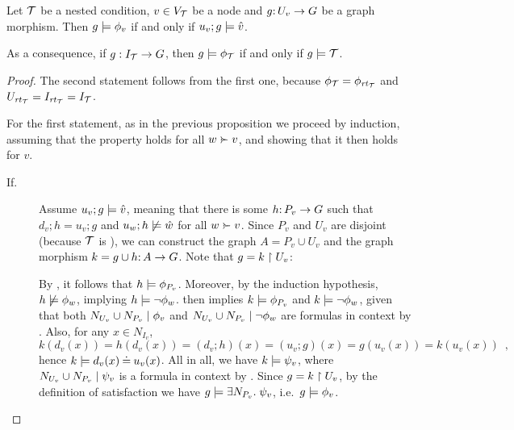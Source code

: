 \begin{theorem}
	\label{th:comparing satisfactions}
	Let ${\mathcal{T}}$ be a {\proper} nested condition, $v \in V_{\mathcal{T}}$ be a node and $g{:}\, U_v \rightarrow G$ be a graph morphism. Then $g\models \phi_v$ if and only if $u_v;g\models \hat v$. 
	
	As a consequence, if $g: I_{\mathcal{T}} \rightarrow G$, then $g\models\phi_{\mathcal{T}}$ if and only if $g\models{\mathcal{T}}$.
\end{theorem}
%
\begin{proof}
	The second statement follows from the first one, because $\phi_{\mathcal{T}} = \phi_{\mathit{rt}_{{\mathcal{T}}}}$ and $U_{\mathit{rt}_{{\mathcal{T}}}} = I_{\mathit{rt}_{{\mathcal{T}}}} = I_{\mathcal{T}}$.
%

For the first statement, as in the previous proposition we proceed by induction, assuming that the property holds for all $w\childof v$, and showing that it then holds for $v$.
%
\begin{description}
\item[If.] Assume $u_v;g\models \hat v$, meaning that there is some $h{:}\, P_v\rightarrow G$ such that $d_v;h=u_v;g$ and $u_w;h\not\models \hat w$ for all $w\childof v$. Since $P_v$ and $U_v$ are disjoint (because ${\mathcal{T}}$ is \proper), we can construct the graph $A=P_v\cup U_v$ and the graph morphism $k=g\cup h{:}\, A\rightarrow G$. Note that 
$g = k \restriction U_v$: 

\smallskip
By , it follows that $h\models \phi_{P_v}$. Moreover, by the induction hypothesis, $h\not\models \phi_w$, implying $h\models\neg \phi_w$.  then implies $k\models \phi_{P_v}$ and $k\models \neg\phi_w$, given that both ${N_{U_v} \cup N_{P_v}} \mid {\phi_v}$ and ${N_{U_v} \cup N_{P_v}} \mid {\neg \phi_w}$ are formulas in context by .  Also, for any $x\in N_{I_v}$,
\[ k(d_v(x))=h(d_v(x))=(d_v;h)(x) = (u_v;g)(x) = g(u_v(x))=k(u_v(x)) \enspace, \]
hence $k\models d_v(x)\mathbin{\doteq} u_v(x)$. All in all, we have $k\models \psi_v$, where ${N_{U_v} \cup N_{P_v}} \mid {\psi_v}$ is a formula in context by . Since $g = k \restriction U_v$, by the definition of satisfaction we have  $g\models \exists N_{P_v}.\; \psi_v$, i.e.\ $g\models \phi_v$. 


\end{description}
\end{proof}
